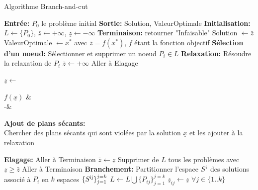 \documentclass[12pt,a4paper,oneside]{book}
\theoremstyle{definition}
\begin{document}
		\begin{algorithm}[H]
		    \caption{Algorithme Branch-and-cut}
    		\SetAlgoLined
    		\DontPrintSemicolon
    		\textbf{Entrée:} $P_0$ le problème initial \;
    		\textbf{Sortie:} Solution, ValeurOptimale \;
    		\textbf{Initialisation:} $L \gets \{P_0\}$, $\bar{z} \gets +\infty$, $\underline{z} \gets -\infty$ \;
    		\textbf{Terminaison:}\;
    		    {
    		        {
    		            retourner "Infaisable" \;
    		        }
    		        {
    		            Solution $\gets \bar{z}$ \;
    		            ValeurOptimale $\gets x^*$ avec $\bar{z} = f(x^*)$, $f$ étant la fonction objectif\;
    		        }
    		    }
    		\textbf{Sélection d'un noeud:}\;
    		    Sélectionner et supprimer un noeud $P_i \in L$ \; 
    		\textbf{Relaxation:} \;
    		    Résoudre la relaxation de $P_i$\;
    		    {
    		        $\bar{z} \gets +\infty$ \;
    		        Aller à Elagage \;
    		    }
    		    {
    		        $\underline{z} \gets$ \begin{cases}
    		                                     $f(\underline{x})$  & \\
    		                                     -\infty & 
    		                              \end{cases} \;
    		        
    		        
    		    }
    		\textbf{Ajout de plans sécants:} \; \\
    		    {
    		        Chercher des plans sécants qui sont violées par la solution $\underline{x}$ et les ajouter à la relaxation \;
    		    }
    		    
    		 \textbf{Elagage:}\;
    		    {
    		        Aller à Terminaison \;
    		    }
    		    {
    		        $\bar{z} \gets \underline{z}$ \;
    		        Supprimer de $L$ tous les problèmes avec $\underline{z} \geq \bar{z}$ \;
    		        Aller à Terminaison \;
    		    }
    		 \textbf{Branchement:} \;
    		 Partitionner l'espace $S\textsuperscript{i}$ des solutions associé à $P_{i}$ en $k$ espaces $\{S\textsuperscript{ij} \}_{j=1}^{j=k}$ \;
			 $ L \gets L \bigcup \{P_{ij} \}_{j=1}^{j=k}$ \;
			 $\underline{z}_{ij} \gets \underline{z}$ \hspace{10pt} $ \forall j \in \{1..k\} $ 
		\end{algorithm}
\end{document}
